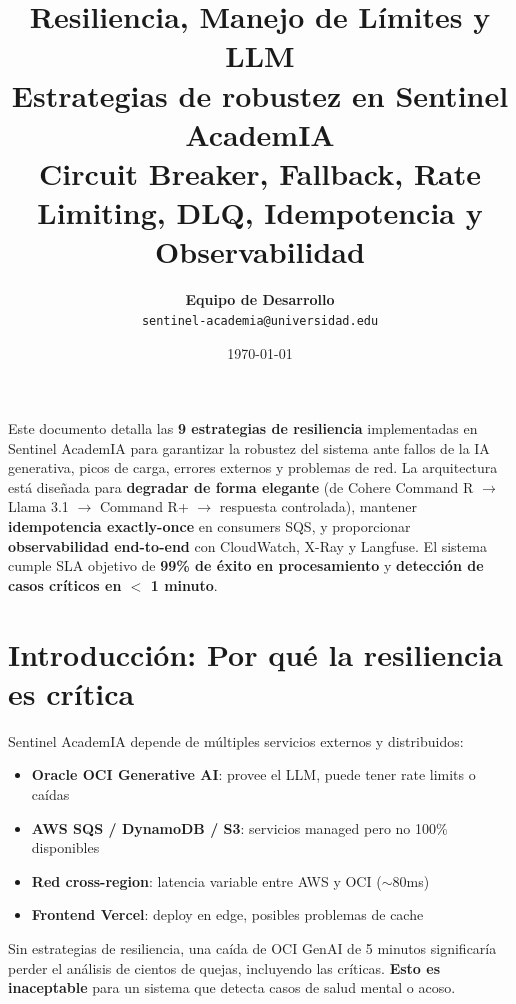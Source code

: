 \documentclass[11pt,a4paper]{article}
\title{
    \vspace{-1cm}
    {\Huge\bfseries\color{primary} Resiliencia, Manejo de L\'imites y LLM}\\[0.4cm]
    {\Large Estrategias de robustez en Sentinel AcademIA}\\[0.6cm]
    {\normalsize Circuit Breaker, Fallback, Rate Limiting, DLQ, Idempotencia y Observabilidad}
}
\author{
    \textbf{Equipo de Desarrollo} \\
    \texttt{sentinel-academia@universidad.edu}
}
\date{\today}
\begin{document}
\maketitle
\thispagestyle{fancy}

\begin{tcolorbox}[colback=codebg, colframe=primary, title=\textbf{Resumen Ejecutivo}]
\small
Este documento detalla las \textbf{9 estrategias de resiliencia} implementadas en Sentinel AcademIA para garantizar la robustez del sistema ante fallos de la IA generativa, picos de carga, errores externos y problemas de red. La arquitectura est\'a dise\~nada para \textbf{degradar de forma elegante} (de Cohere Command R $\rightarrow$ Llama 3.1 $\rightarrow$ Command R+ $\rightarrow$ respuesta controlada), mantener \textbf{idempotencia exactly-once} en consumers SQS, y proporcionar \textbf{observabilidad end-to-end} con CloudWatch, X-Ray y Langfuse. El sistema cumple SLA objetivo de \textbf{99\% de \'exito en procesamiento} y \textbf{detecci\'on de casos cr\'iticos en $<$ 1 minuto}.
\end{tcolorbox}

\tableofcontents
\newpage

\section{Introducci\'on: Por qu\'e la resiliencia es cr\'itica}

Sentinel AcademIA depende de m\'ultiples servicios externos y distribuidos:

\begin{itemize}[leftmargin=*]
    \item \textbf{Oracle OCI Generative AI}: provee el LLM, puede tener rate limits o ca\'idas
    \item \textbf{AWS SQS / DynamoDB / S3}: servicios managed pero no 100\% disponibles
    \item \textbf{Red cross-region}: latencia variable entre AWS y OCI ($\sim$80ms)
    \item \textbf{Frontend Vercel}: deploy en edge, posibles problemas de cache
\end{itemize}

Sin estrategias de resiliencia, una ca\'ida de OCI GenAI de 5 minutos significar\'ia perder el an\'alisis de cientos de quejas, incluyendo las cr\'iticas. \textbf{Esto es inaceptable} para un sistema que detecta casos de salud mental o acoso.
\end{document}
